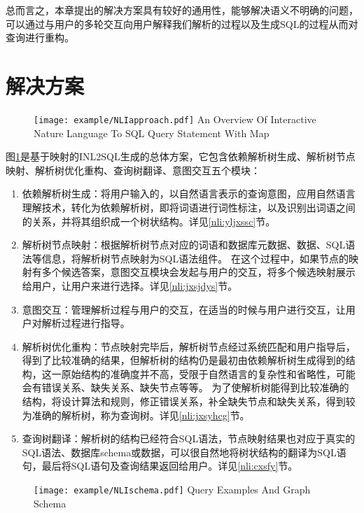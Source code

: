 总而言之，本章提出的解决方案具有较好的通用性，能够解决语义不明确的问题，可以通过与用户的多轮交互向用户解释我们解析的过程以及生成SQL的过程从而对查询进行重构。

\section{解决方案}
\begin{figure}[!htp]
    \centering
    \texttt{[image: example/NLIapproach.pdf]}
      {An Overview Of Interactive Nature Language To SQL Query Statement With Map}
    \label{fig:NLIapproach}
  \end{figure}
图\ref{fig:NLIapproach}是基于映射的INL2SQL生成的总体方案，它包含依赖解析树生成、解析树节点映射、解析树优化重构、查询树翻译、意图交互五个模块：
\begin{enumerate}
    \item 依赖解析树生成：将用户输入的，以自然语言表示的查询意图，应用自然语言理解技术，转化为依赖解析树，即将词语进行词性标注，以及识别出词语之间的关系，并将其组织成一个树状结构。详见\ref{nli:yljxssc}节。
    \item 解析树节点映射：根据解析树节点对应的词语和数据库元数据、数据、SQL语法等信息，将解析树节点映射为SQL语法组件。
在这个过程中，如果节点的映射有多个候选答案，意图交互模块会发起与用户的交互，将多个候选映射展示给用户，让用户来进行选择。详见\ref{nli:jxsjdys}节。
    \item 意图交互：管理解析过程与用户的交互，在适当的时候与用户进行交互，让用户对解析过程进行指导。
    \item 解析树优化重构：节点映射完毕后，解析树节点经过系统匹配和用户指导后，得到了比较准确的结果，但解析树的结构仍是最初由依赖解析树生成得到的结构，这一原始结构的准确度并不高，受限于自然语言的复杂性和省略性，可能会有错误关系、缺失关系、缺失节点等等。
为了使解析树能得到比较准确的结构，将设计算法和规则，修正错误关系，补全缺失节点和缺失关系，得到较为准确的解析树，称为查询树。详见\ref{nli:jxsyhcg}节。
    \item 查询树翻译：解析树的结构已经符合SQL语法，节点映射结果也对应于真实的SQL语法、数据库schema或数据，可以很自然地将树状结构的翻译为SQL语句，最后将SQL语句及查询结果返回给用户。详见\ref{nli:cxsfy}节。
\end{enumerate}

\begin{figure}[!htp]
  \centering
  \texttt{[image: example/NLIschema.pdf]}
    {Query Examples And Graph Schema}
  \label{fig:NLIschema}
\end{figure}

